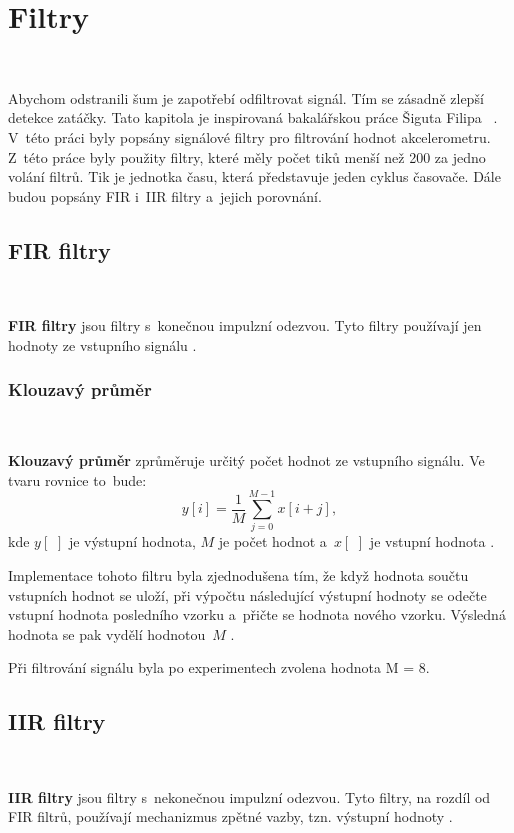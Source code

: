 \chapter{Filtry}
\label{sec:Filters}
\

Abychom odstranili šum je zapotřebí odfiltrovat signál. Tím se zásadně zlepší
detekce zatáčky. Tato kapitola je inspirovaná bakalářskou práce Šiguta Filipa
~\cite{krokomer}.
V~této práci byly popsány signálové filtry pro filtrování hodnot akcelerometru. Z~této práce byly použity filtry, které měly počet tiků menší než 200 za jedno volání filtrů. Tik je jednotka času, která představuje jeden cyklus časovače. Dále budou popsány FIR i~IIR filtry a~jejich porovnání.

\section{FIR filtry}\

\textbf{FIR filtry} jsou filtry s~konečnou impulzní odezvou. Tyto filtry používají
jen hodnoty ze vstupního signálu \cite{FIR}.

\subsection{Klouzavý průměr}\

\textbf{Klouzavý průměr} zprůměruje určitý počet hodnot ze vstupního signálu. Ve
tvaru rovnice to~bude:
\begin{equation}
y[i] = \frac{1}{M}\sum_{j = 0}^{M - 1}x[i+j],
\end{equation}
kde $y[\,\,]$ je výstupní hodnota, $M$ je počet hodnot a~$x[\,\,]$ je vstupní
hodnota \cite{Filters}.

Implementace tohoto filtru byla zjednodušena tím, že když hodnota součtu vstupních
hodnot se uloží, při výpočtu následující výstupní hodnoty se odečte vstupní hodnota
posledního vzorku a~přičte se hodnota nového vzorku. Výsledná hodnota se pak vydělí
hodnotou~$M$ \cite{krokomer}.

Při filtrování signálu byla po experimentech zvolena hodnota M = 8.

\section{IIR filtry}\

\textbf{IIR filtry} jsou filtry s~nekonečnou impulzní odezvou. Tyto filtry, na
rozdíl od FIR filtrů, používají mechanizmus zpětné vazby, tzn. výstupní
hodnoty \cite{IIR}.

